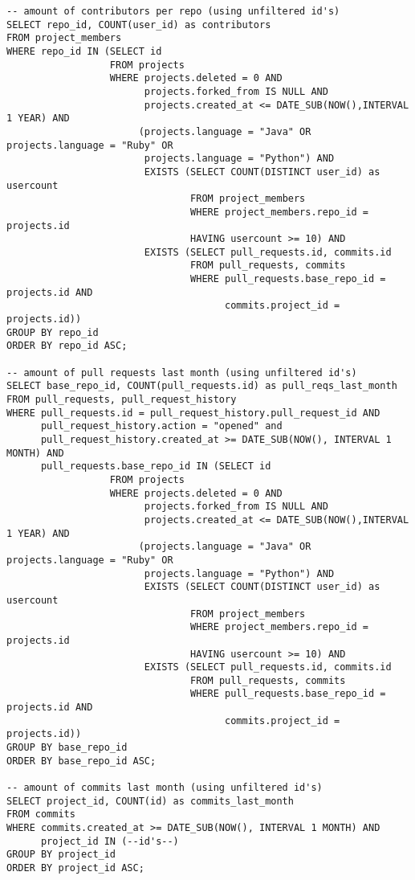 \documentclass[a4paper,11pt]{article}
\begin{document}
	{\scriptsize
	\begin{verbatim}
-- amount of contributors per repo (using unfiltered id's)
SELECT repo_id, COUNT(user_id) as contributors 
FROM project_members 
WHERE repo_id IN (SELECT id  
                  FROM projects 
                  WHERE projects.deleted = 0 AND 
                        projects.forked_from IS NULL AND 
                        projects.created_at <= DATE_SUB(NOW(),INTERVAL 1 YEAR) AND 
                       (projects.language = "Java" OR projects.language = "Ruby" OR 
                        projects.language = "Python") AND 
                        EXISTS (SELECT COUNT(DISTINCT user_id) as usercount 
                                FROM project_members 
                                WHERE project_members.repo_id = projects.id  
                                HAVING usercount >= 10) AND 
                        EXISTS (SELECT pull_requests.id, commits.id 
                                FROM pull_requests, commits 
                                WHERE pull_requests.base_repo_id = projects.id AND 
                                      commits.project_id = projects.id)) 
GROUP BY repo_id 
ORDER BY repo_id ASC;

-- amount of pull requests last month (using unfiltered id's)
SELECT base_repo_id, COUNT(pull_requests.id) as pull_reqs_last_month 
FROM pull_requests, pull_request_history 
WHERE pull_requests.id = pull_request_history.pull_request_id AND 
      pull_request_history.action = "opened" and 
      pull_request_history.created_at >= DATE_SUB(NOW(), INTERVAL 1 MONTH) AND 
      pull_requests.base_repo_id IN (SELECT id 
                  FROM projects 
                  WHERE projects.deleted = 0 AND 
                        projects.forked_from IS NULL AND 
                        projects.created_at <= DATE_SUB(NOW(),INTERVAL 1 YEAR) AND 
                       (projects.language = "Java" OR projects.language = "Ruby" OR 
                        projects.language = "Python") AND 
                        EXISTS (SELECT COUNT(DISTINCT user_id) as usercount 
                                FROM project_members 
                                WHERE project_members.repo_id = projects.id 
                                HAVING usercount >= 10) AND 
                        EXISTS (SELECT pull_requests.id, commits.id 
                                FROM pull_requests, commits 
                                WHERE pull_requests.base_repo_id = projects.id AND 
                                      commits.project_id = projects.id)) 
GROUP BY base_repo_id 
ORDER BY base_repo_id ASC;

-- amount of commits last month (using unfiltered id's)
SELECT project_id, COUNT(id) as commits_last_month 
FROM commits 
WHERE commits.created_at >= DATE_SUB(NOW(), INTERVAL 1 MONTH) AND 
      project_id IN (--id's--) 
GROUP BY project_id 
ORDER BY project_id ASC;
	\end{verbatim}
	}
	
\end{document}
